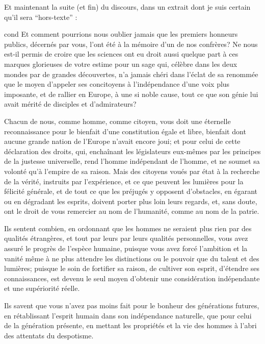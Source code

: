Et maintenant la suite (et fin) du discours, dans un extrait dont je
suis certain qu'il sera \enquote{hors-texte} :
%
\begin{displaycquote}[509-511]{cond}
  Et comment pourrions nous oublier jamais que les premiers honneurs
  publics, décernés par vous, l'ont été à la mémoire d'un de nos
  confrères? Ne nous est-il permis de croire que les sciences ont eu
  droit aussi quelque part à ces marques glorieuses de votre estime
  pour un sage qui, célèbre dans les deux mondes par de grandes
  découvertes, n'a jamais chéri dans l'éclat de sa renommée que le
  moyen d'appeler ses concitoyens à l'indépendance d'une voix plus
  imposante, et de rallier en Europe, à une si noble cause, tout ce
  que son génie lui avait mérité de disciples et d'admirateurs?

  Chacun de nous, comme homme, comme citoyen, vous doit une éternelle
  reconnaissance pour le bienfait d'une constitution égale et libre,
  bienfait dont aucune grande nation de l'Europe n'avait encore joui;
  et pour celui de cette déclaration des droits, qui, enchaînant les
  législateurs eux-mêmes par les principes de la justesse universelle,
  rend l'homme indépendant de l'homme, et ne soumet sa volonté qu'à
  l'empire de sa raison.  Mais des citoyens voués par état à la
  recherche de la vérité, instruits par l'expérience, et ce que
  peuvent les lumières pour la félicité générale, et de tout ce que
  les préjugés y opposent d'obstacles, en égarant ou en dégradant les
  esprits, doivent porter plus loin leurs regards, et, sans doute, ont
  le droit de vous remercier au nom de l'humanité, comme au nom de la
  patrie.

  Ils sentent combien, en ordonnant que les hommes ne seraient plus
  rien par des qualités étrangères, et tout par leurs par leurs
  qualités personnelles, vous avez assuré le progrès de l'espèce
  humaine, puisque vous avez forcé l'ambition et la vanité même à ne
  plus attendre les distinctions ou le pouvoir que du talent et des
  lumières; puisque le soin de fortifier sa raison, de cultiver son
  esprit, d'étendre ses connaissances, est devenu le seul moyen
  d'obtenir une considération indépendante et une supériorité réelle.

  Ils savent que vous n'avez pas moins fait pour le bonheur des
  générations futures, en rétablissant l'esprit humain dans son
  indépendance naturelle, que pour celui de la génération présente, en
  mettant les propriétés et la vie des hommes à l'abri des attentats
  du despotisme.


\end{displaycquote}
